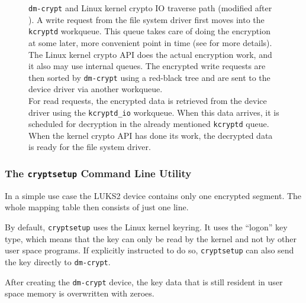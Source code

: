 \begin{figure}[htb!]
	\caption[
		\texttt{dm-crypt} and Linux kernel crypto IO traverse path
	]{
		\texttt{dm-crypt} and Linux kernel crypto IO traverse path (modified after \cite{Korchagin2020}). A write request from the file system driver first moves into the \texttt{kcryptd} workqueue. This queue takes care of doing the encryption at some later, more convenient point in time (see \cite{Linux} for more details). The Linux kernel crypto API does the actual encryption work, and it also may use internal queues. The encrypted write requests are then sorted by \texttt{dm-crypt} using a red-black tree and are sent to the device driver via another workqueue. \\
		For read requests, the encrypted data is retrieved from the device driver using the \texttt{kcryptd\_io} workqueue. When this data arrives, it is scheduled for decryption in the already mentioned \texttt{kcryptd} queue. When the kernel crypto API has done its work, the decrypted data is ready for the file system driver.
	}
	\label{fig:otherapproaches.linux.dmcryptio}
\end{figure}

\subsubsection{The \texttt{cryptsetup} Command Line Utility}
\label{chap:otherapproaches.linux.cryptsetup}

In a simple use case the LUKS2 device contains only one encrypted segment. The whole mapping table then consists of just one line.\\

By default, \texttt{cryptsetup} uses the Linux kernel keyring. It uses the ``logon'' key type, which means that the key can only be read by the kernel and not by other user space programs. If explicitly instructed to do so, \texttt{cryptsetup} can also send the key directly to \texttt{dm-crypt}.

After creating the \texttt{dm-crypt} device, the key data that is still resident in user space memory is overwritten with zeroes.

